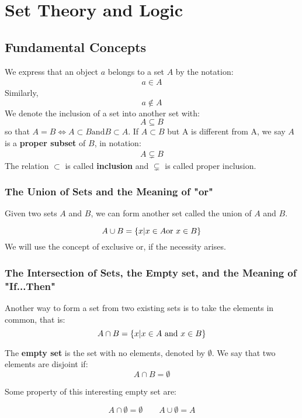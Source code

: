 \chapter{Set Theory and Logic}
\section{Fundamental Concepts}
We express that an object $a$ belongs to a set $A$ by the notation:
\begin{align*}
a \in A
\end{align*}
Similarly,
\[ a \not\in A \]
We denote the inclusion of a set into another set with:
\[ A \subseteq B \]
so that $ A = B  \iff A \subset B \textrm{and} B \subset A $. If $A \subset B$ but A is different from A, we say $A$ is a \textbf{proper subset} of $B$, in notation:
\begin{align*}
A \subsetneq B
\end{align*}
The relation $ \subset $ is called \textbf{inclusion} and $ \subsetneq $ is called proper inclusion. 
\subsection*{The Union of Sets and the Meaning of "or"}

Given two sets $A$ and $B$, we can form another set called the union of $A$ and $B$.

\[ A \cup B = \left\lbrace  x | x \in A \textrm{or } x\in B \right\rbrace \]
We will use the concept of exclusive or, if the necessity arises.

\subsection*{The Intersection of Sets, the Empty set, and the Meaning of "If...Then"}

Another way to form a set from two existing sets is to take the elements in common, that is:
\[ A \cap B = \left\lbrace  x | x \in A \textrm{ and } x \in B \right\rbrace \]

The \textbf{empty set } is the set with no elements, denoted by $ \emptyset $. We say that two elements are disjoint if: 
\[ A \cap B = \emptyset \]

Some property of this interesting empty set are:

\[ A \cap \emptyset = \emptyset \quad \quad A \cup \emptyset = A \]

 


